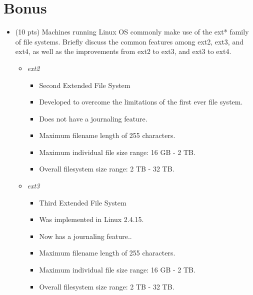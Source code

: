 \documentclass[conference]{IEEEtran}
\begin{document}
\section{Bonus}
\begin{itemize}
	\item (10 pts) Machines running Linux OS commonly make use of the ext* family of file
		systems. Briefly discuss the common features among ext2, ext3, and ext4, as well as the
		improvements from ext2 to ext3, and ext3 to ext4.
	\begin{itemize} 
		\item \textit{ext2}
			\begin{itemize}
				\item Second Extended File System
				\item Developed to overcome the limitations of the first ever file system. 
				\item Does not have a journaling feature.
				\item Maximum filename length of 255 characters.
				\item Maximum individual file size range: 16 GB - 2 TB. 
				\item Overall filesystem size range: 2 TB - 32 TB.
			\end{itemize}
		\item \textit{ext3}
		\begin{itemize}
			\item Third Extended File System
			\item Was implemented in Linux 2.4.15.
			\item Now has a journaling feature..
			\item Maximum filename length of 255 characters.
			\item Maximum individual file size range: 16 GB - 2 TB. 
			\item Overall filesystem size range: 2 TB - 32 TB.
		\end{itemize}
		

\end{itemize}
\end{itemize}
\end{document}
